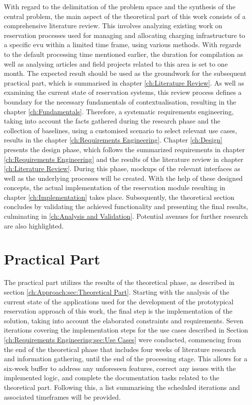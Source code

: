 With regard to the delimitation of the problem space and the synthesis of the central problem, the main aspect of the theoretical part of this work consists of a comprehensive literature review.
This involves analyzing existing work on reservation processes used for managing  and allocating charging infrastructure to a specific \acrshort{evu} within a limited time frame, using various methods.
With regards to the default processing time mentioned earlier, the duration for compilation as well as analysing articles and field projects related to this area is set to one month. 
The expected result should be used as the groundwork for the subsequent practical part, which is summarised in chapter \ref{ch:Literature Review}.
As well as examining the current state of reservation systems, this review process defines a boundary for the necessary fundamentals of contextualisation, resulting in the chapter \ref{ch:Fundamentals}.
Therefore, a systematic requirements engineering, taking into account the facts gathered during the research phase and the collection of baselines, using a customised scenario to select relevant use cases, results in the chapter \ref{ch:Requirements Engineering}.
Chapter \ref{ch:Design} presents the design phase, which follows the summarized requirements in chapter \ref{ch:Requirements Engineering} and the results of the literature review in chapter \ref{ch:Literature Review}. During this phase, mockups of the relevant interfaces as well as the underlying processes will be created.
With the help of these designed concepts, the actual implementation of the reservation module resulting in chapter \ref{ch:Implementation} takes place.
Subsequently, the theoretical section concludes by validating the achieved functionality and presenting the final results, culminating in \ref{ch:Analysis and Validation}. Potential avenues for further research are also highlighted.

\section{Practical Part}
\label{ch:Approach:sec:Practical Part}

The practical part utilizes the results of the theoretical phase, as described in section \ref{ch:Approach:sec:Theoretical Part}. Starting with the analysis of the current state of the applications used for the development of the prototypical reservation approach of this work, the final step is the implementation of the solution, taking into account the elaborated constraints and requirements.
Seven iterations covering the implementation steps for the use cases described in Section \ref{ch:Requirements Engineering:sec:Use Cases} were conducted, commencing from the end of the theoretical phase that includes four weeks of literature research and information gathering, until the end of the processing stage.
This allows for a six-week buffer to address any unforeseen features, correct any issues with the implemented logic, and complete the documentation tasks related to the theoretical part.
Following this, a list summarising the scheduled iterations and associated timeframes will be provided.

